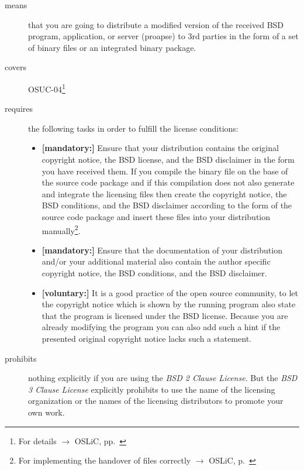 \begin{description}
\item[means] that you are going to distribute a modified version of the received
BSD pro\-gram, application, or server (proapse) to 3rd parties in the form of a set
of binary files or an integrated binary package.
\item[covers] OSUC-04\footnote{For details $\rightarrow$ OSLiC, pp.\ \pageref{OSUC-04-DEF}}
\item[requires] the following tasks in order to fulfill the license conditions:
\begin{itemize}

  \item  \textbf{[mandatory:]} Ensure that your distribution contains the
  original copyright notice, the BSD license, and the BSD disclaimer in the form
  you have received them. If you compile the binary file on the base of the
  source code package and if this compilation does not also generate and
  integrate the licensing files then create the copyright notice, the BSD
  conditions, and the BSD disclaimer according to the form of the source code
  package and insert these files into your distribution manually\footnote{For
  implementing the handover of files correctly $\rightarrow$ OSLiC, p.\ 
  \pageref{DistributingFilesHint}}.

  \item  \textbf{[mandatory:]} Ensure that the documentation of your
  distribution and/or your additional material also contain the author specific
  copyright notice, the BSD conditions, and the BSD disclaimer.
  
  \item \textbf{[voluntary:]} It is a good practice of the open source
  community, to let the copyright notice which is shown by the running program
  also state that the program is licensed under the BSD license. Because you are
  already modifying the program you can also add such a hint if the presented
  original copyright notice lacks such a statement.
\end{itemize}

\item[prohibits] nothing explicitly if you are using the \emph{BSD 2 Clause
License}. But the \emph{BSD 3 Clause License} explicitly prohibits to use the
name of the licensing organization or the names of the licensing distributors to
promote your own work.

\end{description}


